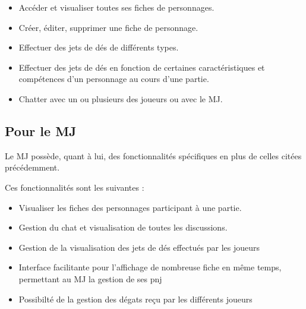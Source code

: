 ﻿\documentclass[11pt,a4paper]{article}
\begin{document}
\begin{itemize}
  \item Accéder et visualiser toutes ses fiches de personnages.
  \item Créer, éditer, supprimer une fiche de personnage.
  \item Effectuer des jets de dés de différents types.
  \item Effectuer des jets de dés en fonction de certaines caractéristiques et
  compétences d'un personnage au cours d'une partie.
  \item Chatter avec un ou plusieurs des joueurs ou avec le MJ.
\end{itemize}

\subsection{Pour le MJ}
Le MJ possède, quant à lui, des fonctionnalités spécifiques en plus de celles
citées précédemment.

Ces fonctionnalités sont les suivantes :

\begin{itemize}
  \item Visualiser les fiches des personnages participant à une partie.
  \item Gestion du chat et visualisation de toutes les discussions.
\item Gestion de la visualisation des jets de dés effectués par les joueurs
\item Interface facilitante pour l'affichage de nombreuse fiche en même temps, permettant au MJ la gestion de ses pnj 
\item Possibilté de la gestion des dégats reçu par les différents joueurs
\end{itemize}

\clearpage
  
\end{document}
